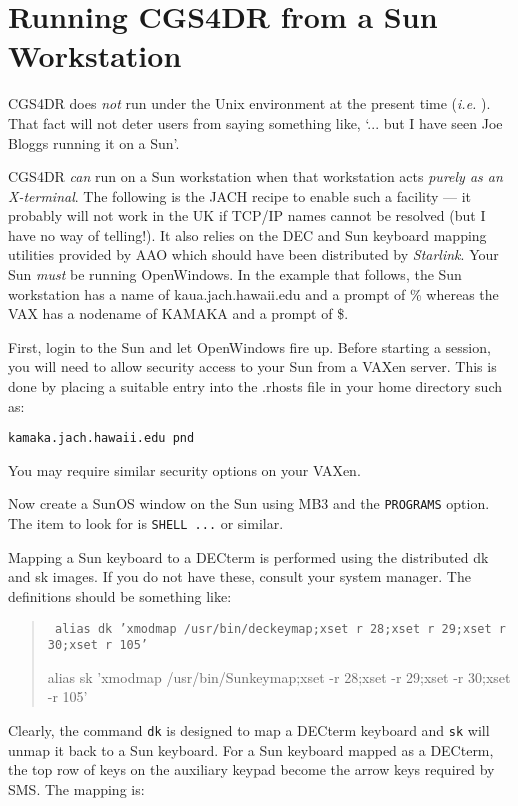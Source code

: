 \section{Running CGS4DR from a Sun Workstation}

CGS4DR does {\em not} run under the Unix environment at the present time 
({\em i.e.} \stardocdate). That fact will not deter users from saying
something like, `... but I have seen Joe Bloggs running it on a Sun'.

CGS4DR {\em can} run on a Sun workstation when that workstation acts {\em 
purely as an X-terminal}. The following is the JACH recipe to enable such a
facility --- it probably will not work in the UK if TCP/IP names cannot  be
resolved (but I have no way of telling!). It also relies on the DEC and  Sun
keyboard mapping utilities provided by AAO which should have been  distributed
by {\sl Starlink}. Your Sun {\em must} be running OpenWindows. In the  example
that follows, the Sun workstation has a name of kaua.jach.hawaii.edu and a
prompt of {\sf \%} whereas the VAX has a nodename of KAMAKA and a prompt of
{\sf \$}.

First, login to the Sun and let OpenWindows fire up.
Before starting a session, you will need to allow security access to
your Sun from a VAXen server. This is done by placing a suitable entry
into the .rhosts file in your home directory such as:

\begin{verbatim}
kamaka.jach.hawaii.edu pnd
\end{verbatim}

You may require similar security options on your VAXen.

Now create a SunOS window on the Sun using MB3 and the {\tt PROGRAMS} option.
The item to look for is {\tt SHELL ...} or similar.

Mapping a Sun keyboard to a DECterm is performed using the distributed
{\sf dk} and {\sf sk} images. If you do not have these, consult your 
system manager. The definitions should be something like:

\begin{quote}
{\scriptsize \tt
  alias dk 'xmodmap /usr/bin/deckeymap;xset  r 28;xset  r 29;xset  r 30;xset  r 105'

  alias sk 'xmodmap /usr/bin/Sunkeymap;xset -r 28;xset -r 29;xset -r 30;xset -r 105'
}
\end{quote}

Clearly, the command {\tt dk} is designed to map a DECterm keyboard and 
{\tt sk} will unmap it back to a Sun keyboard. For a Sun keyboard mapped as a 
DECterm, the top row of keys on the auxiliary keypad become the arrow
keys required by SMS. The mapping is:

